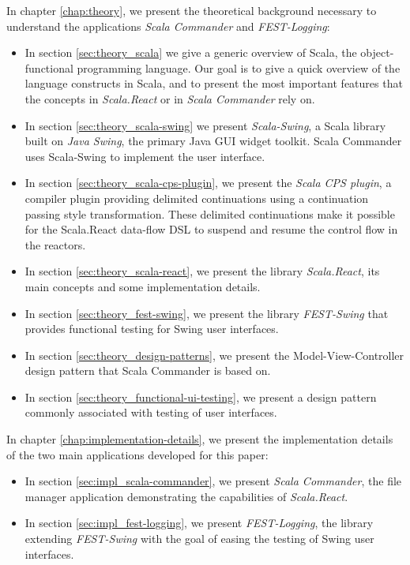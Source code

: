 In chapter \ref{chap:theory}, we present the theoretical background necessary to understand the applications \emph{Scala Commander} and \emph{FEST-Logging}:
\begin{itemize}
\item In section \ref{sec:theory_scala} we give a generic overview of Scala, the object-functional programming language. Our goal is to give a quick overview of the language constructs in Scala, and to present the most important features that the concepts in \emph{Scala.React} or in \emph{Scala Commander} rely on. %

\item In section \ref{sec:theory_scala-swing} we present \emph{Scala-Swing}, a Scala library built on \emph{Java Swing}, the primary Java GUI widget toolkit. \cite{SwingWiki} Scala Commander uses Scala-Swing to implement the user interface.

\item In section \ref{sec:theory_scala-cps-plugin}, we present the \emph{Scala CPS plugin}, a compiler plugin providing delimited continuations using a continuation passing style transformation. These delimited continuations make it possible for the Scala.React data-flow DSL to suspend and resume the control flow in the reactors.

\item In section \ref{sec:theory_scala-react}, we present the library \emph{Scala.React}, its main concepts and some implementation details.

\item In section \ref{sec:theory_fest-swing}, we present the library \emph{FEST-Swing} that provides functional testing for Swing user interfaces.

\item In section \ref{sec:theory_design-patterns}, we present the Model-View-Controller design pattern that Scala Commander is based on.

\item In section \ref{sec:theory_functional-ui-testing}, we present a design pattern commonly associated with testing of user interfaces.
\end{itemize}

In chapter \ref{chap:implementation-details}, we present the implementation details of the two main applications developed for this paper:
\begin{itemize}
\item In section \ref{sec:impl_scala-commander}, we present \emph{Scala Commander}, the file manager application demonstrating the capabilities of \emph{Scala.React}.
\item In section \ref{sec:impl_fest-logging}, we present \emph{FEST-Logging}, the library extending \emph{FEST-Swing} with the goal of easing the testing of Swing user interfaces.
\end{itemize}







